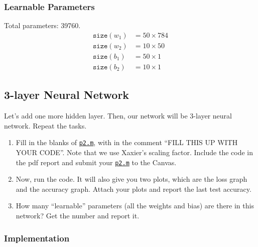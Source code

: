 \subsubsection{Learnable Parameters}
Total parameters: 39760.
\begin{align*}
    \texttt{size}(w_1)&=50\times784\\
    \texttt{size}(w_2)&=10\times50\\
    \texttt{size}(b_1)&=50\times1\\
    \texttt{size}(b_2)&=10\times1
\end{align*}

\newpage
\subsection{3-layer Neural Network}
Let's add one more hidden layer.
Then, our network will be 3-layer neural network.
Repeat the tasks.
\begin{enumerate}
    \item Fill in the blanks of \href{./hw6/p2.m}{\texttt{p2.m}}, with in the comment ``FILL THIS UP WITH YOUR CODE''.
    Note that we use Xaxier's scaling factor.
    Include the code in the pdf report and submit your \href{./hw6/p2.m}{\texttt{p2.m}} to the Canvas.
    \item Now, run the code.
    It will also give you two plots, which are the loss graph and the accuracy graph.
    Attach your plots and report the last test accuracy.
    \item How many ``learnable'' parameters (all the weights and bias) are there in this network?
    Get the number and report it.
\end{enumerate}
\subsubsection{Implementation}

